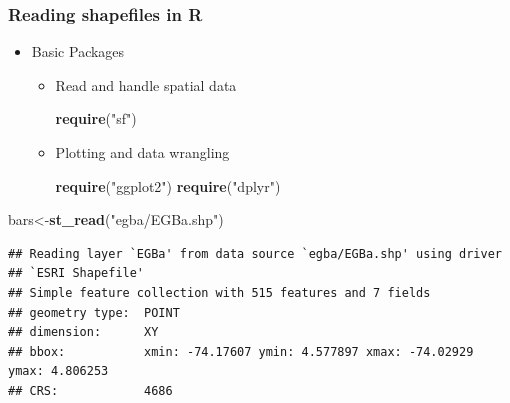 \documentclass[
  shownotes,
  xcolor={svgnames},
  hyperref={colorlinks,citecolor=DarkBlue,linkcolor=DarkRed,urlcolor=DarkBlue}
  ]{beamer}
\newenvironment{Shaded}{\begin{snugshade}}{\end{snugshade}}
\newcommand{\KeywordTok}[1]{\textcolor[rgb]{0.13,0.29,0.53}{\textbf{#1}}}
\newcommand{\NormalTok}[1]{#1}
\newcommand{\StringTok}[1]{\textcolor[rgb]{0.31,0.60,0.02}{#1}}
\begin{document}
\begin{frame}[fragile]
\frametitle{Reading shapefiles in R}

\begin{itemize}
	\item Basic Packages
	\begin{itemize}
		\item Read and handle spatial data
		\begin{scriptsize}
		\begin{Shaded}
		\begin{Highlighting}[]
\KeywordTok{require}\NormalTok{(}\StringTok{"sf"}\NormalTok{)}
		\end{Highlighting}
		\end{Shaded}
		\end{scriptsize}
		\item Plotting and data wrangling
		\begin{scriptsize}
		\begin{Shaded}
		\begin{Highlighting}[]
\KeywordTok{require}\NormalTok{(}\StringTok{"ggplot2"}\NormalTok{)}
\KeywordTok{require}\NormalTok{(}\StringTok{"dplyr"}\NormalTok{)}
		\end{Highlighting}
		\end{Shaded}
		\end{scriptsize}
	\end{itemize}	
\end{itemize}

\begin{scriptsize}
\begin{Shaded}
\begin{Highlighting}[]
\NormalTok{bars\textless{}{-}}\KeywordTok{st\_read}\NormalTok{(}\StringTok{"egba/EGBa.shp"}\NormalTok{)}
\end{Highlighting}
\end{Shaded}

\begin{verbatim}
## Reading layer `EGBa' from data source `egba/EGBa.shp' using driver 
## `ESRI Shapefile'
## Simple feature collection with 515 features and 7 fields
## geometry type:  POINT
## dimension:      XY
## bbox:           xmin: -74.17607 ymin: 4.577897 xmax: -74.02929 ymax: 4.806253
## CRS:            4686
\end{verbatim}

\end{scriptsize}

\end{frame}
\end{document}
